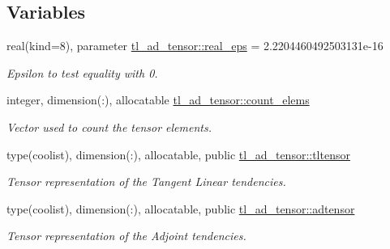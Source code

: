\subsection*{Variables}
\begin{DoxyCompactItemize}
\item 
real(kind=8), parameter \hyperlink{namespacetl__ad__tensor_a05a4b79ccb098a47a400e175e12c1c6c}{tl\+\_\+ad\+\_\+tensor\+::real\+\_\+eps} = 2.\+2204460492503131e-\/16
\begin{DoxyCompactList}\small\item\em Epsilon to test equality with 0. \end{DoxyCompactList}\item 
integer, dimension(\+:), allocatable \hyperlink{namespacetl__ad__tensor_a8836f34c3a96c44c487c7910ab8c7507}{tl\+\_\+ad\+\_\+tensor\+::count\+\_\+elems}
\begin{DoxyCompactList}\small\item\em Vector used to count the tensor elements. \end{DoxyCompactList}\item 
type(coolist), dimension(\+:), allocatable, public \hyperlink{namespacetl__ad__tensor_a6180cfcc4d4ad119ef93266ea955903c}{tl\+\_\+ad\+\_\+tensor\+::tltensor}
\begin{DoxyCompactList}\small\item\em Tensor representation of the Tangent Linear tendencies. \end{DoxyCompactList}\item 
type(coolist), dimension(\+:), allocatable, public \hyperlink{namespacetl__ad__tensor_af0a4e6cdc6d653fa808eedaa7ce331de}{tl\+\_\+ad\+\_\+tensor\+::adtensor}
\begin{DoxyCompactList}\small\item\em Tensor representation of the Adjoint tendencies. \end{DoxyCompactList}\end{DoxyCompactItemize}
